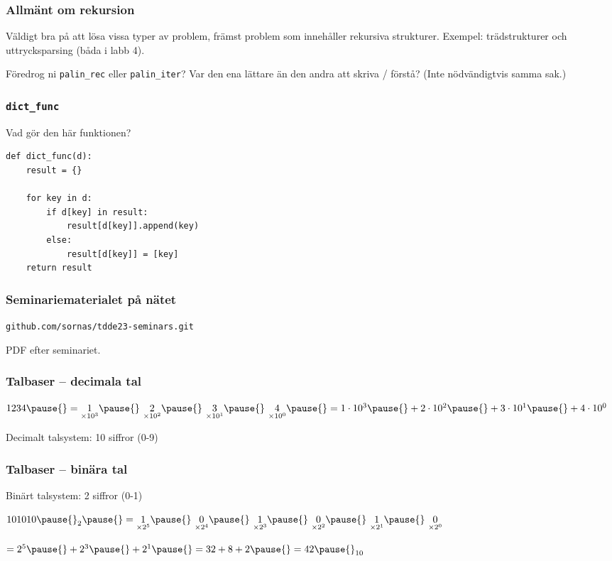 \documentclass{beamer}
\begin{document}
  \begin{frame}
    \frametitle{Allmänt om rekursion}

    Väldigt bra på att lösa vissa typer av problem, främst problem som
    innehåller rekursiva strukturer. Exempel: trädstrukturer och uttrycksparsing
    (båda i labb 4).

    Föredrog ni \texttt{palin\_rec} eller \texttt{palin\_iter}? Var den ena
    lättare än den andra att skriva / förstå? (Inte nödvändigtvis samma sak.)

  \end{frame}

  \begin{frame}[fragile]
    \frametitle{\texttt{dict\_func}}

    Vad gör den här funktionen?

    \begin{verbatim}
def dict_func(d):
    result = {}

    for key in d:
        if d[key] in result:
            result[d[key]].append(key)
        else:
            result[d[key]] = [key]
    return result
    \end{verbatim}

  \end{frame}

  \begin{frame}
    \frametitle{Seminariematerialet på nätet}

    \texttt{github.com/sornas/tdde23-seminars.git}

    PDF efter seminariet.
  \end{frame}

  \begin{frame}
    \frametitle{Talbaser -- decimala tal}

    \(1234 \pause{} = \underset{\times 10^3}{1} \pause{}\ \underset{\times 10^2}{2} \pause{}\ \underset{\times 10^1}{3} \pause{}\ \underset{\times 10^0}{4} \pause{} = 1 \cdot 10^3 \pause{} + 2 \cdot 10^2 \pause{} + 3 \cdot 10^1 \pause{} + 4 \cdot 10^0\)

    \pause{}

    Decimalt talsystem: 10 siffror (0-9)

  \end{frame}

  \begin{frame}
    \frametitle{Talbaser -- binära tal}

    Binärt talsystem: 2 siffror (0-1)

    \pause{}

    \(101010\pause{}_2 \pause{} = \underset{\times 2^5}{1} \pause{}\ \underset{\times 2^4}{0} \pause{}\ \underset{\times 2^3}{1} \pause{}\ \underset{\times 2^2}{0} \pause{}\ \underset{\times 2^1}{1} \pause{}\ \underset{\times 2^0}{0}\)

    \pause{}

    \vspace{-0.5em}

    \(= 2^5 \pause{} + 2^3 \pause{} + 2^1 \pause{} = 32 + 8 + 2 \pause{} = 42\pause{}_{10}\)

  \end{frame}
\end{document}
